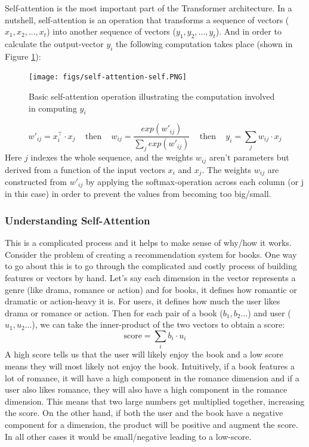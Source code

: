 \documentclass[12pt,a4paper,twoside,openright]{report}
\begin{document}
Self-attention is the most important part of the Transformer architecture. In a nutshell, self-attention is an operation that transforms a sequence of vectors ($x_1, x_2, ... , x_t$) into another sequence of vectors ($y_1, y_2, ... , y_t$). And in order to calculate the output-vector $y_i$ the following computation takes place (shown in Figure \ref{fig:basic-self-attention}):
\begin{figure}[H]
    \centering
    \texttt{[image: figs/self-attention-self.PNG]}
    \caption{Basic self-attention operation illustrating the computation involved in computing $y_i$}
    \label{fig:basic-self-attention}
\end{figure}
\[
w'_{ij} = x_i^{\top} \cdot x_j
\;\;\;\text{ then }\;\;\;
w_{ij} = \frac{exp(w'_{ij})}{\sum_j exp(w'_{ij})}
\;\;\;\text{ then }\;\;\;
y_i = \sum_j w_{ij} \cdot x_j\]
Here $j$ indexes the whole sequence, and the weights $w_{ij}$ aren't parameters but derived from a function of the input vectors $x_i$ and $x_j$. The weights $w_{ij}$ are constructed from $w'_{ij}$ by applying the softmax-operation across each column (or j in this case) in order to prevent the values from becoming too big/small.


\subsubsection{Understanding Self-Attention}
This is a complicated process and it helps to make sense of why/how it works.
Consider the problem of creating a recommendation system for books. One way to go about this is to go through the complicated and costly process of building features or vectors by hand. Let's say each dimension in the vector represents a genre (like drama, romance or action) and for books, it defines how romantic or dramatic or action-heavy it is. For users, it defines how much the user likes drama or romance or action. Then for each pair of a book ($b_1, b_2...$) and user ($u_1, u_2...$), we can take the inner-product of the two vectors to obtain a score:
\[ \text{score} = \sum_i b_i \cdot u_i \]
A high score tells us that the user will likely enjoy the book and a low score means they will most likely not enjoy the book. Intuitively, if a book features a lot of romance, it will have a high component in the romance dimension and if a user also likes romance, they will also have a high component in the romance dimension. This means that two large numbers get multiplied together, increasing the score. On the other hand, if both the user and the book have a negative component for a dimension, the product will be positive and augment the score. In all other cases it would be small/negative leading to a low-score.
\end{document}
